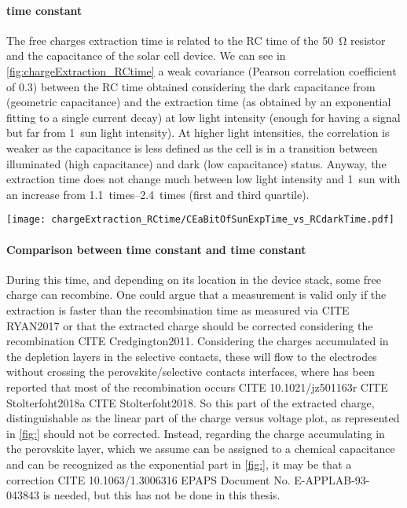 	\paragraph{ time constant}
	The free charges extraction time is related to the RC time of the \SI{50}{\ohm} resistor and the capacitance of the solar cell device. We can see in \cref{fig:chargeExtraction_RCtime} a weak covariance (Pearson correlation coefficient of 0.3) between the RC time obtained considering the dark capacitance from  (geometric capacitance) and the extraction time (as obtained by an exponential fitting to a single  current decay) at low light intensity (enough for having a signal but far from 1~sun light intensity). At higher light intensities, the correlation is weaker as the capacitance is less defined as the cell is in a transition between illuminated (high capacitance) and dark (low capacitance) status. Anyway, the extraction time does not change much between low light intensity and 1~sun with an increase from \SIrange{1.1}{2.4}{times} (first and third quartile).

	\begin{SCfigure}%
		\centering
		\texttt{[image: chargeExtraction\_RCtime/CEaBitOfSunExpTime\_vs\_RCdarkTime.pdf]}
		\label{fig:chargeExtraction_RCtime}
	\end{SCfigure}

	\paragraph{Comparison between  time constant and  time constant}
	During this time, and depending on its location in the device stack, some free charge can recombine. One could argue that a  measurement is valid only if the extraction is faster than the recombination time as measured via CITE RYAN2017 or that the extracted charge should be corrected considering the recombination CITE Credgington2011. Considering the charges accumulated in the depletion layers in the selective contacts, these will flow to the electrodes without crossing the perovskite/selective contacts interfaces, where has been reported that most of the recombination occurs CITE 10.1021/jz501163r CITE Stolterfoht2018a CITE Stolterfoht2018. So this part of the extracted charge, distinguishable as the linear part of the charge versus voltage plot, as represented in \cref{fig:} should not be corrected. Instead, regarding the charge accumulating in the perovskite layer, which we assume can be assigned to a chemical capacitance and can be recognized as the exponential part in \cref{fig:}, it may be that a correction CITE 10.1063/1.3006316 EPAPS Document No. E-APPLAB-93-043843 is needed, but this has not be done in this thesis.


